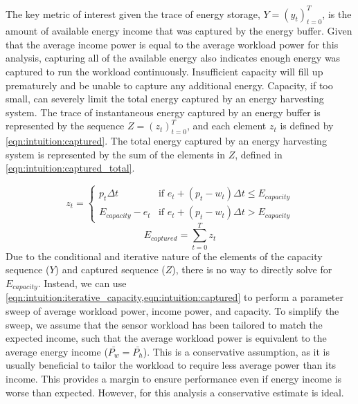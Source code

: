 The key metric of interest given the trace of energy storage, $Y = (y_t)_{t=0}^T$, is  
the amount of available energy income that was captured by the energy buffer. 
Given that the average income power is equal to the average workload power for this analysis, capturing all of the available energy also indicates enough energy was captured to run the workload continuously. 
Insufficient capacity will fill up prematurely and be unable to capture any additional energy. 
Capacity, if too small, can severely limit the total energy captured by an energy harvesting system.
The trace of instantaneous energy captured by an energy buffer is represented by the sequence $Z = (z_t)^T_{t=0}$, and each element $z_t$ is defined by \cref{eqn:intuition:captured}. The total energy captured by an energy harvesting system is represented by the sum of the elements in $Z$, defined in \cref{eqn:intuition:captured_total}.

\begin{equation} \label{eqn:intuition:captured}
    z_t = \begin{cases}
        p_t \Delta t & \text{if $e_t + (p_t - w_t) \Delta t \leq E_{capacity}$} \\
        E_{capacity} - e_t & \text{if $e_t + (p_t - w_t) \Delta t > E_{capacity}$} 
    \end{cases}
\end{equation}
\begin{equation} \label{eqn:intuition:captured_total}
    E_{captured} = \sum^T_{t=0} z_t
\end{equation}
Due to the conditional and iterative nature of the elements of the capacity sequence ($Y$) and captured sequence ($Z$), there is no way to directly solve for $E_{capacity}$.
Instead, we can use \cref{eqn:intuition:iterative_capacity,eqn:intuition:captured} to perform a parameter sweep of average workload power, income power, and capacity.
To simplify the sweep, we assume that the sensor workload has been tailored to match the expected income, such that the average workload power is equivalent to the average energy income ($\bar{P_w} = \bar{P_h}$). 
This is a conservative assumption, as it is usually beneficial to tailor the workload to require less average power than its income. 
This provides a margin to ensure performance even if energy income is worse than expected. However, for this analysis a conservative estimate is ideal.

